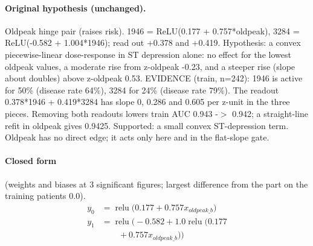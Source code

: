 \documentclass[a4paper,10pt]{article}
\newif\ifreviewmarks
\newcommand{\reviewrule}{\noindent{\color{BrickRed}\rule{\linewidth}{0.8pt}}}
\newenvironment{drafted}[1][]{%
  \ifreviewmarks\par\addvspace{\medskipamount}\reviewrule\par\nopagebreak
  \noindent{\color{BrickRed}\sffamily\footnotesize\textbf{Thesis Draft}\quad #1\hfill review}\par\nopagebreak\smallskip\fi}{%
  \ifreviewmarks\par\smallskip\noindent{\color{BrickRed}\sffamily\footnotesize end of thesis draft}\par\nopagebreak\reviewrule\par\medskip\fi}
\begin{document}
\begin{drafted}[plain-language layer: heart-s2-c1]
\paragraph{Original hypothesis (unchanged).} Oldpeak hinge pair (raises risk). 1946 = ReLU(0.177 + 0.757*oldpeak), 3284 = ReLU(-0.582 + 1.004*1946); read out +0.378 and +0.419. Hypothesis: a convex piecewise-linear dose-response in ST depression alone: no effect for the lowest oldpeak values, a moderate rise from z-oldpeak -0.23, and a steeper rise (slope about doubles) above z-oldpeak 0.53. EVIDENCE (train, n=242): 1946 is active for 50\% (disease rate 64\%), 3284 for 24\% (disease rate 79\%). The readout 0.378*1946 + 0.419*3284 has slope 0, 0.286 and 0.605 per z-unit in the three pieces. Removing both readouts lowers train AUC 0.943 -$>$ 0.942; a straight-line refit in oldpeak gives 0.9425. Supported: a small convex ST-depression term. Oldpeak has no direct edge; it acts only here and in the flat-slope gate.
\paragraph{Closed form} {\footnotesize(weights and biases at 3 significant figures; largest difference from the part on the training patients 0.0).}
{\small\begingroup\allowdisplaybreaks
\begin{align*}
y_{0} &= \operatorname{relu}\bigl(0.177 + 0.757 x_{oldpeak\_b}\bigr) \\
y_{1} &= \operatorname{relu}\bigl(-0.582 + 1.0 \operatorname{relu}\bigl(0.177 \\
&\qquad + 0.757 x_{oldpeak\_b}\bigr)\bigr)
\end{align*}\endgroup}


\end{drafted}
\end{document}
